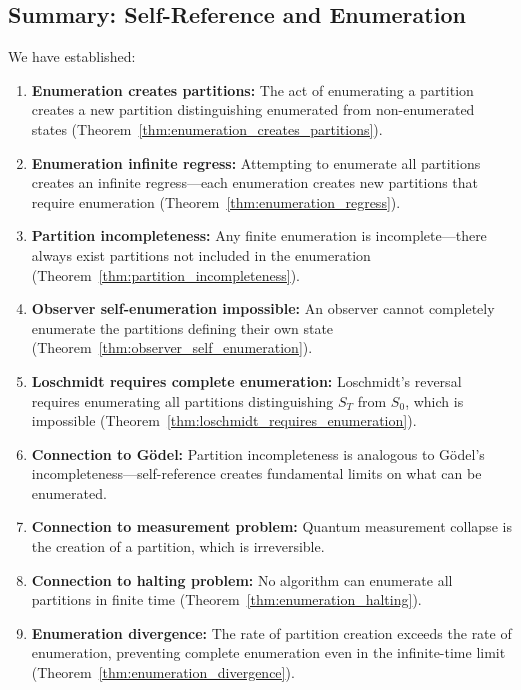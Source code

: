 \documentclass[twocolumn,10pt]{article}
\theoremstyle{definition}
\theoremstyle{remark}
\begin{document}
\subsection{Summary: Self-Reference and Enumeration}

We have established:

\begin{enumerate}
\item \textbf{Enumeration creates partitions:} The act of enumerating a partition creates a new partition distinguishing enumerated from non-enumerated states (Theorem~\ref{thm:enumeration_creates_partitions}).

\item \textbf{Enumeration infinite regress:} Attempting to enumerate all partitions creates an infinite regress—each enumeration creates new partitions that require enumeration (Theorem~\ref{thm:enumeration_regress}).

\item \textbf{Partition incompleteness:} Any finite enumeration is incomplete—there always exist partitions not included in the enumeration (Theorem~\ref{thm:partition_incompleteness}).

\item \textbf{Observer self-enumeration impossible:} An observer cannot completely enumerate the partitions defining their own state (Theorem~\ref{thm:observer_self_enumeration}).

\item \textbf{Loschmidt requires complete enumeration:} Loschmidt's reversal requires enumerating all partitions distinguishing $S_T$ from $S_0$, which is impossible (Theorem~\ref{thm:loschmidt_requires_enumeration}).

\item \textbf{Connection to Gödel:} Partition incompleteness is analogous to Gödel's incompleteness—self-reference creates fundamental limits on what can be enumerated.

\item \textbf{Connection to measurement problem:} Quantum measurement collapse is the creation of a partition, which is irreversible.

\item \textbf{Connection to halting problem:} No algorithm can enumerate all partitions in finite time (Theorem~\ref{thm:enumeration_halting}).

\item \textbf{Enumeration divergence:} The rate of partition creation exceeds the rate of enumeration, preventing complete enumeration even in the infinite-time limit (Theorem~\ref{thm:enumeration_divergence}).
\end{enumerate}
\end{document}
